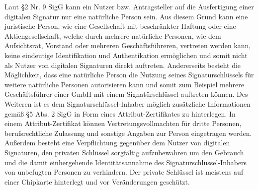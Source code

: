 Laut \S 2 Nr. 9 SigG kann ein Nutzer bzw. Antragsteller auf die Ausfertigung einer digitalen Signatur nur eine natürliche Person sein. Aus diesem Grund kann eine juristische Person, wie eine Gesellschaft mit beschränkter Haftung oder eine Aktiengesellschaft, welche durch mehrere natürliche Personen, wie dem Aufsichtsrat, Vorstand oder mehreren Geschäftsführeren, vertreten werden kann, keine eindeutige Identifikation und Authentikation ermöglichen und somit nicht als Nutzer von digitalen Signaturen direkt auftreten. Andererseits besteht die Möglichkeit, dass eine natürliche Person die Nutzung seines Signaturschlüssels für weitere natürliche Personen autorisieren kann und somit zum Beispiel mehrere Geschäftsführer einer GmbH mit einem Signatürschlüssel auftreten können. Des Weiteren ist es dem Signaturschlüssel-Inhaber möglich zusätzliche Informationen gemäß \S 5 Abs. 2 SigG in Form eines Attribut-Zertifikates zu hinterlegen. In einem Attribut-Zertifikat können Vertretungsvollmachten für dritte Personen, berufsrechtliche Zulassung und sonstige Angaben zur Person eingetragen werden. Außerdem besteht eine Verpflichtung gegenüber dem Nutzer von digitalen Signaturen, den privaten Schlüssel sorgfältig aufzubewahren um den Gebrauch und die damit einhergehende Identitätsannahme des Signaturschlüssel-Inhabers von unbefugten Personen zu verhindern. Der private Schlüssel ist meistens auf einer Chipkarte hinterlegt und vor Veränderungen geschützt. \cite{standdeswissens3}\cite{standdeswissens4}
